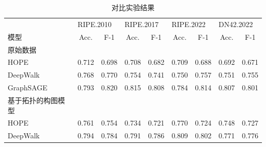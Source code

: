 \begin{table}
    \caption{对比实验结果}
    \begin{tabular}{lcccccccc}
        \toprule
                        & \multicolumn{2}{l}{RIPE.2010} & \multicolumn{2}{l}{RIPE.2017} & \multicolumn{2}{l}{RIPE.2022} & \multicolumn{2}{l}{DN42.2022}                                                                     \\ \cmidrule(lr){2-3} \cmidrule(lr){4-5} \cmidrule(lr){6-7} \cmidrule(lr){8-9}
        模型              & Acc.                          & F-1                           & Acc.                          & F-1                           & Acc.           & F-1            & Acc.           & F-1            \\ \midrule
        原始数据                                                                                                                                                                                                                \\
        \quad HOPE      & 0.712                         & 0.698                         & 0.708                         & 0.682                         & 0.709          & 0.688          & 0.692          & 0.671          \\
        \quad DeepWalk  & 0.768                         & 0.770                         & 0.754                         & 0.741                         & 0.750          & 0.757          & 0.751          & 0.755          \\
        \quad GraphSAGE & 0.793                         & 0.820                         & 0.815                         & 0.808                         & 0.784          & 0.814          & 0.807          & 0.801          \\ \midrule
        基于拓扑的构图模型                                                                                                                                                                                                           \\
        \quad HOPE      & 0.761                         & 0.754                         & 0.734                         & 0.721                         & 0.770          & 0.724          & 0.748          & 0.727          \\
        \quad DeepWalk  & 0.794                         & 0.784                         & 0.791                         & 0.786                         & 0.809          & 0.802          & 0.771          & 0.776          \\

\end{tabular}
\end{table}
